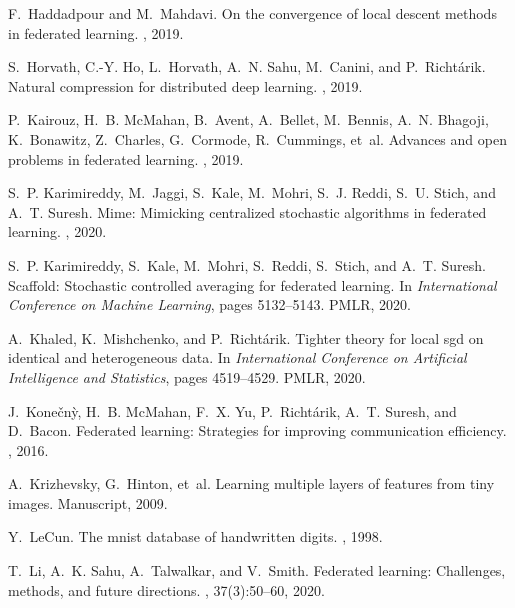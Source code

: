 \documentclass[11pt]{article}
\begin{document}
\begin{thebibliography}{10}
F.~Haddadpour and M.~Mahdavi.
\newblock On the convergence of local descent methods in federated learning.
, 2019.

S.~Horvath, C.-Y. Ho, L.~Horvath, A.~N. Sahu, M.~Canini, and P.~Richt{\'a}rik.
\newblock Natural compression for distributed deep learning.
, 2019.

P.~Kairouz, H.~B. McMahan, B.~Avent, A.~Bellet, M.~Bennis, A.~N. Bhagoji,
  K.~Bonawitz, Z.~Charles, G.~Cormode, R.~Cummings, et~al.
\newblock Advances and open problems in federated learning.
, 2019.

S.~P. Karimireddy, M.~Jaggi, S.~Kale, M.~Mohri, S.~J. Reddi, S.~U. Stich, and
  A.~T. Suresh.
\newblock Mime: Mimicking centralized stochastic algorithms in federated
  learning.
, 2020.

S.~P. Karimireddy, S.~Kale, M.~Mohri, S.~Reddi, S.~Stich, and A.~T. Suresh.
\newblock Scaffold: Stochastic controlled averaging for federated learning.
\newblock In {\em International Conference on Machine Learning}, pages
  5132--5143. PMLR, 2020.

A.~Khaled, K.~Mishchenko, and P.~Richt{\'a}rik.
\newblock Tighter theory for local sgd on identical and heterogeneous data.
\newblock In {\em International Conference on Artificial Intelligence and
  Statistics}, pages 4519--4529. PMLR, 2020.

J.~Kone{\v{c}}n{\`y}, H.~B. McMahan, F.~X. Yu, P.~Richt{\'a}rik, A.~T. Suresh,
  and D.~Bacon.
\newblock Federated learning: Strategies for improving communication
  efficiency.
, 2016.

A.~Krizhevsky, G.~Hinton, et~al.
\newblock Learning multiple layers of features from tiny images.
\newblock Manuscript, 2009.

Y.~LeCun.
\newblock The mnist database of handwritten digits.
, 1998.

T.~Li, A.~K. Sahu, A.~Talwalkar, and V.~Smith.
\newblock Federated learning: Challenges, methods, and future directions.
, 37(3):50--60, 2020.


\end{thebibliography}
\end{document}

